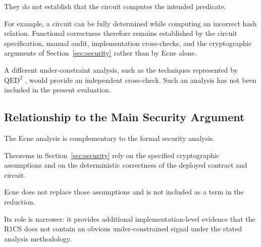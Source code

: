 \documentclass[10pt,twocolumn]{article}
\begin{document}
They do not establish that the circuit computes the intended predicate.

For example, a circuit can be fully determined while computing an
incorrect hash relation. Functional correctness therefore remains
established by the circuit specification, manual audit, implementation
cross-checks, and the cryptographic arguments of
Section~\ref{sec:security} rather than by Ecne alone.

A different under-constraint analysis, such as the techniques
represented by $\mathrm{QED}^2$ \cite{qed2}, would provide an independent
cross-check. Such an analysis has not been included in the present
evaluation.

\subsection{Relationship to the Main Security Argument}

The Ecne analysis is complementary to the formal security analysis.

Theorems in Section~\ref{sec:security} rely on the specified
cryptographic assumptions and on the deterministic correctness of the
deployed contract and circuit.

Ecne does not replace those assumptions and is not included as a term in
the reduction.

Its role is narrower: it provides additional implementation-level
evidence that the R1CS does not contain an obvious under-constrained
signal under the stated analysis methodology.
\end{document}
